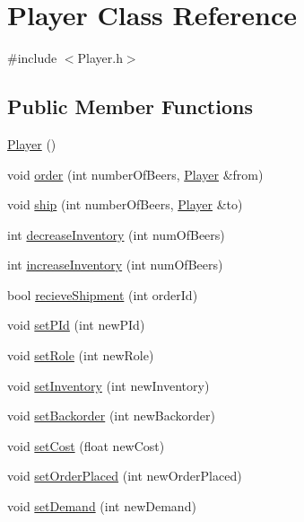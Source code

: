 \hypertarget{classPlayer}{}\section{Player Class Reference}
\label{classPlayer}


{\ttfamily \#include $<$Player.\+h$>$}

\subsection*{Public Member Functions}
\begin{DoxyCompactItemize}
\item 
\hyperlink{classPlayer_affe0cc3cb714f6deb4e62f0c0d3f1fd8}{Player} ()
\item 
void \hyperlink{classPlayer_a44d67418e9628bcebb094cb08d2b8645}{order} (int number\+Of\+Beers, \hyperlink{classPlayer}{Player} \&from)
\item 
void \hyperlink{classPlayer_a99b3fcf7fa83e14419716b090892d6c8}{ship} (int number\+Of\+Beers, \hyperlink{classPlayer}{Player} \&to)
\item 
int \hyperlink{classPlayer_ad7e72eebf5097d94027610f80ca0cb78}{decrease\+Inventory} (int num\+Of\+Beers)
\item 
int \hyperlink{classPlayer_af56bd09888271421534c020d51fde332}{increase\+Inventory} (int num\+Of\+Beers)
\item 
bool \hyperlink{classPlayer_aba9c1a26d978924957526ec5652702a6}{recieve\+Shipment} (int order\+Id)
\item 
void \hyperlink{classPlayer_a17e0bd230257e3026226e46a4ab4dc11}{set\+P\+Id} (int new\+P\+Id)
\item 
void \hyperlink{classPlayer_ad15e1ac6cf80b1492d69a37d7cfb7372}{set\+Role} (int new\+Role)
\item 
void \hyperlink{classPlayer_a1f305ca526f8d5665fc3778cfdd10af1}{set\+Inventory} (int new\+Inventory)
\item 
void \hyperlink{classPlayer_a137d9597bcb0f47168cf1527cb07625a}{set\+Backorder} (int new\+Backorder)
\item 
void \hyperlink{classPlayer_adfe98f17f78bb7a89baee1c34ee09c75}{set\+Cost} (float new\+Cost)
\item 
void \hyperlink{classPlayer_a8823e72be11b1ab41620eafedf1a28e3}{set\+Order\+Placed} (int new\+Order\+Placed)
\item 
void \hyperlink{classPlayer_a8dc0985588eeb8785a6cda41dfc496a9}{set\+Demand} (int new\+Demand)
\item 

\end{DoxyCompactItemize}
